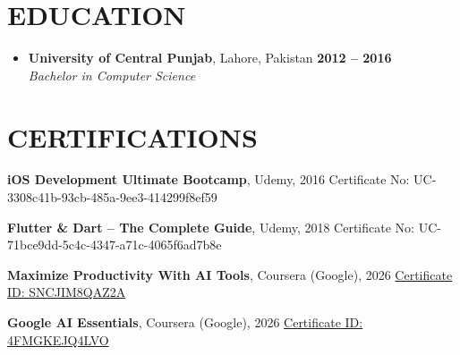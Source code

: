 \documentclass[a4paper,10pt]{article}
\newcommand{\resumeEntry}[4]{%
  \vspace{2pt}\item
    \textbf{\large #1}, {\small #2} \hfill \textbf{\small #4}\\
    \textit{#3}\vspace{-4pt}%
}
\newcommand{\resumeCertification}[4]{%
  \noindent\textbf{#1}, #2, #4 \hfill {\small #3}\par\vspace{0pt}%
}
\newcommand{\resumeSubHeadingListStart}{\begin{itemize}[leftmargin=0.0in, label={}]}
\newcommand{\resumeSubHeadingListEnd}{\end{itemize}}
\begin{document}
\section{EDUCATION}
  \resumeSubHeadingListStart
    \resumeEntry
      {University of Central Punjab}{Lahore, Pakistan}
      {Bachelor in Computer Science}{2012 -- 2016}
  \resumeSubHeadingListEnd
\vspace{-4pt}

\section{CERTIFICATIONS}
    \resumeCertification
        {iOS Development Ultimate Bootcamp}{Udemy}
        {Certificate No: UC-3308c41b-93cb-485a-9ee3-414299f8ef59}{2016}
    \resumeCertification
        {Flutter \& Dart -- The Complete Guide}{Udemy}
        {Certificate No: UC-71bce9dd-5c4c-4347-a71c-4065f6ad7b8e}{2018}
    \resumeCertification
        {Maximize Productivity With AI Tools}{Coursera (Google)}
        {\href{https://www.coursera.org/account/accomplishments/verify/SNCJIM8QAZ2A}{Certificate ID: SNCJIM8QAZ2A}}{2026}
    \resumeCertification
        {Google AI Essentials}{Coursera (Google)}
        {\href{https://www.coursera.org/account/accomplishments/specialization/certificate/4FMGKEJQ4LVO}{Certificate ID: 4FMGKEJQ4LVO}}{2026}
\end{document}
